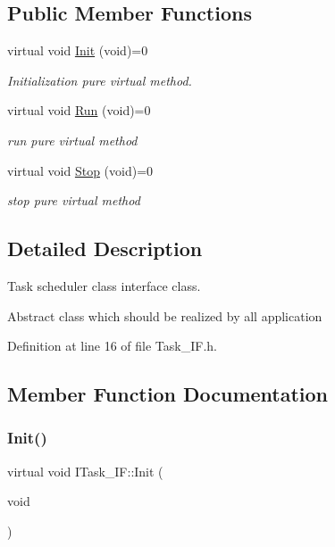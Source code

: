 \subsection*{Public Member Functions}
\begin{DoxyCompactItemize}
\item 
virtual void \mbox{\hyperlink{class_i_task___i_f_a28f608bdb9b19658403f7b9b7421968d}{Init}} (void)=0
\begin{DoxyCompactList}\small\item\em Initialization pure virtual method. \end{DoxyCompactList}\item 
virtual void \mbox{\hyperlink{class_i_task___i_f_ab73cc5879a61d00fc59b72cce32cc6f7}{Run}} (void)=0
\begin{DoxyCompactList}\small\item\em run pure virtual method \end{DoxyCompactList}\item 
virtual void \mbox{\hyperlink{class_i_task___i_f_af5f8fba86704c7e36d0e4681d58300c6}{Stop}} (void)=0
\begin{DoxyCompactList}\small\item\em stop pure virtual method \end{DoxyCompactList}\end{DoxyCompactItemize}


\subsection{Detailed Description}
Task scheduler class interface class. 

Abstract class which should be realized by all application 

Definition at line 16 of file Task\+\_\+\+I\+F.\+h.



\subsection{Member Function Documentation}
\mbox{\label{class_i_task___i_f_a28f608bdb9b19658403f7b9b7421968d}} 
\subsubsection{\texorpdfstring{Init()}{Init()}}
{\footnotesize\ttfamily virtual void I\+Task\+\_\+\+I\+F\+::\+Init (\begin{DoxyParamCaption}\item[{void}]{ }\end{DoxyParamCaption})\hspace{0.3cm}{\ttfamily [pure virtual]}}



